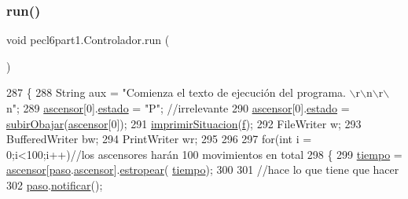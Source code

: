 \subsubsection{\texorpdfstring{run()}{run()}}
{\footnotesize\ttfamily void pecl6part1.\+Controlador.\+run (\begin{DoxyParamCaption}{ }\end{DoxyParamCaption})\hspace{0.3cm}{\ttfamily [inline]}}


\begin{DoxyCode}
287     \{
288          String aux = \textcolor{stringliteral}{"Comienza el texto de ejecución del programa. \(\backslash\)r\(\backslash\)n\(\backslash\)r\(\backslash\)n"};
289          \mbox{\hyperlink{classpecl6part1_1_1_controlador_ab1a946290b47216d355b09da476486db}{ascensor}}[0].\mbox{\hyperlink{classpecl6part1_1_1_ascensor_ad892045a12a5bfbd5b352fede74a1d0f}{estado}} = \textcolor{stringliteral}{"P"}; \textcolor{comment}{//irrelevante}
290          \mbox{\hyperlink{classpecl6part1_1_1_controlador_ab1a946290b47216d355b09da476486db}{ascensor}}[0].\mbox{\hyperlink{classpecl6part1_1_1_ascensor_ad892045a12a5bfbd5b352fede74a1d0f}{estado}} = \mbox{\hyperlink{classpecl6part1_1_1_controlador_a95c13a9d652492249ed581fce7756392}{subirObajar}}(\mbox{\hyperlink{classpecl6part1_1_1_controlador_ab1a946290b47216d355b09da476486db}{ascensor}}[0]);
291          \mbox{\hyperlink{classpecl6part1_1_1_controlador_aa62f73857e81fc76b5621497d0e10149}{imprimirSituacion}}(\mbox{\hyperlink{classpecl6part1_1_1_controlador_a105bb0bb218c9e351cc76ddcb259a426}{f}});
292          FileWriter w;
293          BufferedWriter bw;
294          PrintWriter wr;
295          
296          
297             \textcolor{keywordflow}{for}(\textcolor{keywordtype}{int} i = 0;i<100;i++)\textcolor{comment}{//los ascensores harán 100 movimientos en total}
298             \{
299             \mbox{\hyperlink{classpecl6part1_1_1_controlador_a2c971f9177446bce4a9d77472fedb100}{tiempo}} = \mbox{\hyperlink{classpecl6part1_1_1_controlador_ab1a946290b47216d355b09da476486db}{ascensor}}[\mbox{\hyperlink{classpecl6part1_1_1_controlador_af51f3a80f264d4175c0381f8b5e8edc0}{paso}}.\mbox{\hyperlink{classpecl6part1_1_1_monitor_a6a25fb9f29d59a43156c1c2413d3b5f0}{ascensor}}].\mbox{\hyperlink{classpecl6part1_1_1_ascensor_aff7ce91902c28ffca4ef4bff6622bb24}{estropear}}(
      \mbox{\hyperlink{classpecl6part1_1_1_controlador_a2c971f9177446bce4a9d77472fedb100}{tiempo}});
300             
301             \textcolor{comment}{//hace lo que tiene que hacer}
302                 \mbox{\hyperlink{classpecl6part1_1_1_controlador_af51f3a80f264d4175c0381f8b5e8edc0}{paso}}.\mbox{\hyperlink{classpecl6part1_1_1_monitor_a0d517f29c1d3a1bcc10a0fc80283a342}{notificar}}();

\end{DoxyCode}
